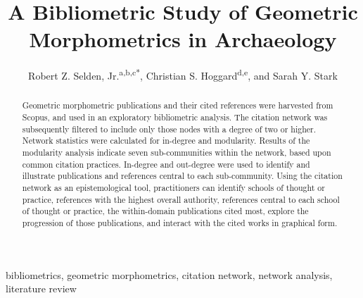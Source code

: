 \documentclass[review]{elsarticle}
\begin{document}
\begin{frontmatter}

\title{A Bibliometric Study of Geometric Morphometrics in Archaeology}

\author{Robert Z. Selden, Jr.\textsuperscript{a,b,c*}, Christian S. Hoggard\textsuperscript{d,e}, and Sarah Y. Stark\textsuperscript{}}
\address[1]{Heritage Research Center, Stephen F. Austin State University, US}
\address[2]{Cultural Heritage Department, Jean Monnet University, FR}
\address[3]{ORCID ID \href{http://orcid.org/0000-0002-1789-8449}{0000-0002-1789-8449}}
\address[4]{Department of Archaeology and Anthropology, University of Southampton, UK}
\address[5]{ORCID ID \href{http://orcid.org/0000-0002-0022-3605}{0000-0002-0022-3605}}

\begin{abstract}
Geometric morphometric publications and their cited references were harvested from Scopus, and used in an exploratory bibliometric analysis. The citation network was subsequently filtered to include only those nodes with a degree of two or higher. Network statistics were calculated for in-degree and modularity. Results of the modularity analysis indicate seven sub-communities within the network, based upon common citation practices. In-degree and out-degree were used to identify and illustrate publications and references central to each sub-community. Using the citation network as an epistemological tool, practitioners can identify schools of thought or practice, references with the highest overall authority, references central to each school of thought or practice, the within-domain publications cited most, explore the progression of those publications, and interact with the cited works in graphical form.
\end{abstract}

\begin{keyword}
bibliometrics, geometric morphometrics, citation network, network analysis, literature review
\end{keyword}

\end{frontmatter}

\linenumbers

\section*{}




\end{document}
